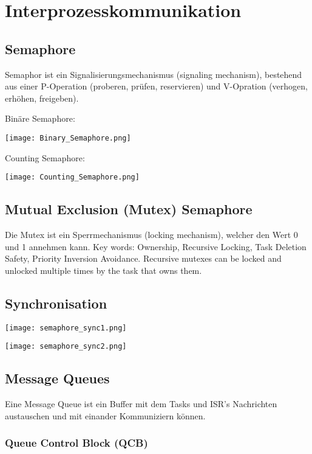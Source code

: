 \section{Interprozesskommunikation}

\subsection{Semaphore}

Semaphor ist ein Signalisierungsmechanismus (signaling mechanism), bestehend aus einer P-Operation (proberen, prüfen, reservieren) und V-Opration (verhogen, erhöhen, freigeben).

Binäre Semaphore:

\texttt{[image: Binary\_Semaphore.png]}

Counting Semaphore:

\texttt{[image: Counting\_Semaphore.png]}

\subsection{Mutual Exclusion (Mutex) Semaphore}

Die Mutex ist ein Sperrmechanismus (locking mechanism), welcher den Wert 0 und 1 annehmen kann.
Key words: Ownership, Recursive Locking, Task Deletion Safety, Priority Inversion Avoidance.
Recursive mutexes can be locked and unlocked multiple times by the task that owns them.

\subsection{Synchronisation}

\begin{center}
    \texttt{[image: semaphore\_sync1.png]}

    \texttt{[image: semaphore\_sync2.png]}
\end{center}


\subsection{Message Queues}

Eine Message Queue ist ein Buffer mit dem Tasks und ISR's Nachrichten austauschen und mit einander Kommuniziern können.

\subsubsection{Queue Control Block (QCB)}

